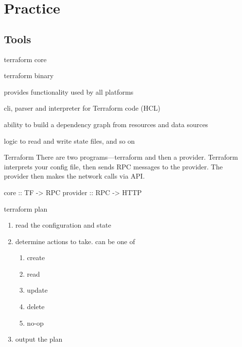 \documentclass[openany, 12pt]{book}
\begin{document}
\part{Practice}
\chapter{Tools}
\begin{definition}{terraform core}{}
	\begin{alist}
		\item terraform binary
		\item provides functionality used by all platforms
		\item cli, parser and interpreter for Terraform code (HCL)
		\item ability to build a dependency graph from resources and data sources
		\item logic to read and write state files, and so on
	\end{alist}
\end{definition}

\begin{intuition}{Terraform}{}
	There are two programs---terraform and then a provider. Terraform interprets
	your config file, then sends RPC messages to the provider. The provider then
	makes the network calls via API.\@
	\begin{haskell}{}
core     :: TF -> RPC
provider :: RPC -> HTTP
	\end{haskell}
\end{intuition}

\begin{definition}{terraform plan}{}
	\begin{enumerate}[label = {(\arabic*)}]
		\item read the configuration and state
		\item determine actions to take. can be one of
		      \begin{multicols}{5}
			      \begin{enumerate}[label = {(\arabic*)}]
				      \item create
				      \item read
				      \item update
				      \item delete
				      \item no-op
			      \end{enumerate}
		      \end{multicols}
		\item output the plan
	\end{enumerate}
\end{definition}
\end{document}
